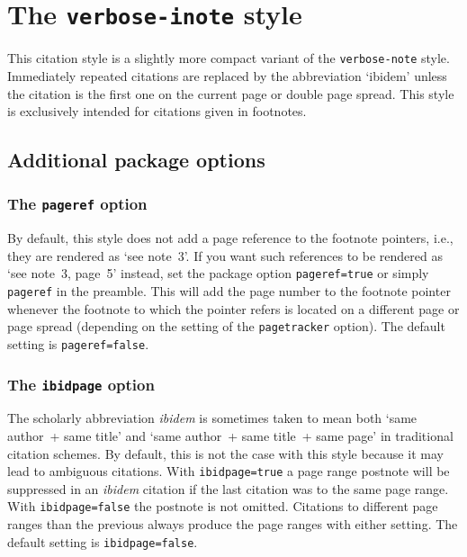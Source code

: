 \documentclass[a4paper]{article}
\begin{document}
\section*{The \texttt{verbose-inote} style}

This citation style is a slightly more compact variant of the
\texttt{verbose-note} style. Immediately repeated citations are
replaced by the abbreviation `ibidem' unless the citation is the
first one on the current page or double page spread. This style is
exclusively intended for citations given in footnotes.

\subsection*{Additional package options}

\subsubsection*{The \texttt{pageref} option}

By default, this style does not add a page reference to the footnote
pointers, i.e., they are rendered as `see note~3'. If you want such
references to be rendered as `see note~3, page~5' instead, set the
package option \texttt{pageref=true} or simply \texttt{pageref} in
the preamble. This will add the page number to the footnote pointer
whenever the footnote to which the pointer refers is located on a
different page or page spread (depending on the setting of the
\texttt{pagetracker} option). The default setting is
\texttt{pageref=false}.

\subsubsection*{The \texttt{ibidpage} option}

The scholarly abbreviation \emph{ibidem} is sometimes taken to mean
both `same author~+ same title' and `same author~+ same title~+ same
page' in traditional citation schemes. By default, this is not the
case with this style because it may lead to ambiguous citations.
With \texttt{ibidpage=true} a page range postnote will be suppressed
in an \emph{ibidem} citation if the last citation was to the same
page range. With \texttt{ibidpage=false} the postnote is not omitted.
Citations to different page ranges than the previous always produce
the page ranges with either setting.
The default setting is \texttt{ibidpage=false}.
\end{document}
